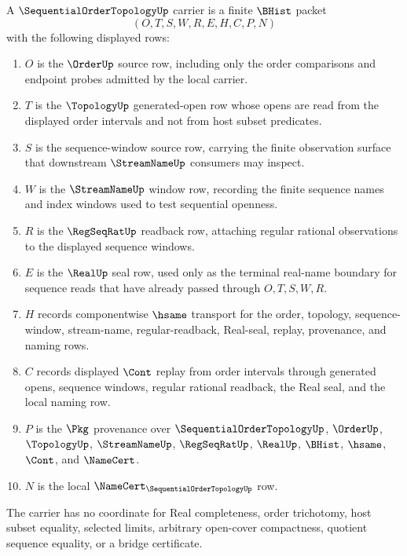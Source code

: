 \begin{definition}
\label{def:sequential-order-topology-carrier}
A $\SequentialOrderTopologyUp$ carrier is a finite $\BHist$ packet
$$
(O,T,S,W,R,E,H,C,P,N)
$$
with the following displayed rows:
\begin{enumerate}
\item $O$ is the $\OrderUp$ source row, including only the order comparisons and endpoint probes admitted by the local carrier.
\item $T$ is the $\TopologyUp$ generated-open row whose opens are read from the displayed order intervals and not from host subset predicates.
\item $S$ is the sequence-window source row, carrying the finite observation surface that downstream $\StreamNameUp$ consumers may inspect.
\item $W$ is the $\StreamNameUp$ window row, recording the finite sequence names and index windows used to test sequential openness.
\item $R$ is the $\RegSeqRatUp$ readback row, attaching regular rational observations to the displayed sequence windows.
\item $E$ is the $\RealUp$ seal row, used only as the terminal real-name boundary for sequence reads that have already passed through $O,T,S,W,R$.
\item $H$ records componentwise $\hsame$ transport for the order, topology, sequence-window, stream-name, regular-readback, Real-seal, replay, provenance, and naming rows.
\item $C$ records displayed $\Cont$ replay from order intervals through generated opens, sequence windows, regular rational readback, the Real seal, and the local naming row.
\item $P$ is the $\Pkg$ provenance over $\SequentialOrderTopologyUp$, $\OrderUp$, $\TopologyUp$, $\StreamNameUp$, $\RegSeqRatUp$, $\RealUp$, $\BHist$, $\hsame$, $\Cont$, and $\NameCert$.
\item $N$ is the local $\NameCert_{\SequentialOrderTopologyUp}$ row.
\end{enumerate}
The carrier has no coordinate for Real completeness, order trichotomy, host subset equality, selected limits, arbitrary open-cover compactness, quotient sequence equality, or a bridge certificate.
\end{definition}

